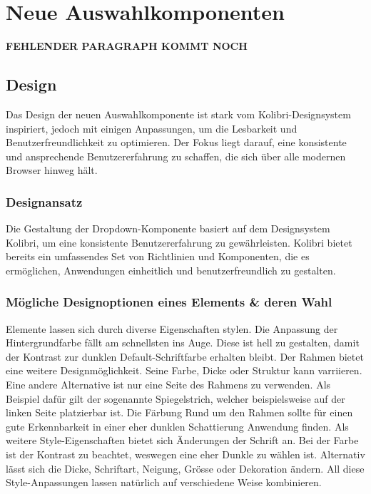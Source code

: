 \chapter{Neue Auswahlkomponenten}
\label{chap:newComponent}

{\color{red} \textbf{FEHLENDER PARAGRAPH KOMMT NOCH}}


\section{Design}
\label{sec:design}

Das Design der neuen Auswahlkomponente ist stark vom Kolibri-Designsystem inspiriert, jedoch mit einigen Anpassungen, um die Lesbarkeit und Benutzerfreundlichkeit zu optimieren. 
Der Fokus liegt darauf, eine konsistente und ansprechende Benutzererfahrung zu schaffen, die sich über alle modernen Browser hinweg hält.


\subsection{Designansatz}
\label{sec:designIdea}

Die Gestaltung der Dropdown-Komponente basiert auf dem Designsystem Kolibri, um eine konsistente Benutzererfahrung zu gewährleisten. 
Kolibri bietet bereits ein umfassendes Set von Richtlinien und Komponenten, die es ermöglichen, Anwendungen einheitlich und benutzerfreundlich zu gestalten.


\subsection{Mögliche Designoptionen eines Elements \& deren Wahl}
\label{sec:possibleDesignOptions}

Elemente lassen sich durch diverse Eigenschaften stylen.
Die Anpassung der Hintergrundfarbe fällt am schnellsten ins Auge.
Diese ist hell zu gestalten, damit der Kontrast zur dunklen Default-Schriftfarbe erhalten bleibt.
Der Rahmen bietet eine weitere Designmöglichkeit. 
Seine Farbe, Dicke oder Struktur kann varriieren. 
Eine andere Alternative ist nur eine Seite des Rahmens zu verwenden. 
Als Beispiel dafür gilt der sogenannte Spiegelstrich, welcher beispielsweise auf der linken Seite platzierbar ist.
Die Färbung Rund um den Rahmen sollte für einen gute Erkennbarkeit in einer eher dunklen Schattierung Anwendung finden.
Als weitere Style-Eigenschaften bietet sich Änderungen der Schrift an.
Bei der Farbe ist der Kontrast zu beachtet, weswegen eine eher Dunkle zu wählen ist.
Alternativ lässt sich die Dicke, Schriftart, Neigung, Grösse oder Dekoration ändern.
All diese Style-Anpassungen lassen natürlich auf verschiedene Weise kombinieren.

